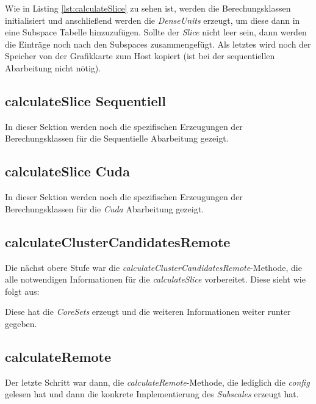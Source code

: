 

Wie in Listing \ref{lst:calculateSlice} zu sehen ist, werden die Berechungsklassen initialisiert und anschließend werden die 
\emph{DenseUnits} erzeugt, um diese dann in eine Subspace Tabelle hinzuzufügen. Sollte der \emph{Slice} nicht leer sein, dann 
werden die Einträge noch nach den Subspaces zusammengefügt. Als letztes wird noch der Speicher von der Grafikkarte zum Host kopiert 
(ist bei der sequentiellen Abarbeitung nicht nötig). 

\subsection{calculateSlice Sequentiell}
In dieser Sektion werden noch die spezifischen Erzeugungen der Berechungsklassen für die Sequentielle Abarbeitung gezeigt.



\subsection{calculateSlice Cuda}
In dieser Sektion werden noch die spezifischen Erzeugungen der Berechungsklassen für die \emph{Cuda} Abarbeitung gezeigt.



\subsection{calculateClusterCandidatesRemote}
Die nächst obere Stufe war die \emph{calculateClusterCandidatesRemote}-Methode, die alle notwendigen 
Informationen für die \emph{calculateSlice} vorbereitet. Diese sieht wie folgt aus:



Diese hat die \emph{CoreSets} erzeugt und die weiteren Informationen weiter runter gegeben.

\subsection{calculateRemote}
Der letzte Schritt war dann, die \emph{calculateRemote}-Methode, die lediglich die \emph{config}
gelesen hat und dann die konkrete Implementierung des \emph{Subscales} erzeugt hat. 


